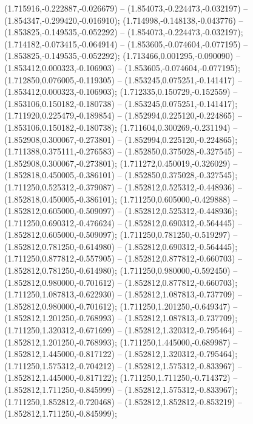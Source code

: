  (1.715916,-0.222887,-0.026679) -- (1.854073,-0.224473,-0.032197) -- (1.854347,-0.299420,-0.016910);
 (1.714998,-0.148138,-0.043776) -- (1.853825,-0.149535,-0.052292) -- (1.854073,-0.224473,-0.032197);
 (1.714182,-0.073415,-0.064914) -- (1.853605,-0.074604,-0.077195) -- (1.853825,-0.149535,-0.052292);
 (1.713466,0.001295,-0.090090) -- (1.853412,0.000323,-0.106903) -- (1.853605,-0.074604,-0.077195);
 (1.712850,0.076005,-0.119305) -- (1.853245,0.075251,-0.141417) -- (1.853412,0.000323,-0.106903);
 (1.712335,0.150729,-0.152559) -- (1.853106,0.150182,-0.180738) -- (1.853245,0.075251,-0.141417);
 (1.711920,0.225479,-0.189854) -- (1.852994,0.225120,-0.224865) -- (1.853106,0.150182,-0.180738);
 (1.711604,0.300269,-0.231194) -- (1.852908,0.300067,-0.273801) -- (1.852994,0.225120,-0.224865);
 (1.711388,0.375111,-0.276583) -- (1.852850,0.375028,-0.327545) -- (1.852908,0.300067,-0.273801);
 (1.711272,0.450019,-0.326029) -- (1.852818,0.450005,-0.386101) -- (1.852850,0.375028,-0.327545);
 (1.711250,0.525312,-0.379087) -- (1.852812,0.525312,-0.448936) -- (1.852818,0.450005,-0.386101);
 (1.711250,0.605000,-0.429888) -- (1.852812,0.605000,-0.509097) -- (1.852812,0.525312,-0.448936);
 (1.711250,0.690312,-0.476624) -- (1.852812,0.690312,-0.564445) -- (1.852812,0.605000,-0.509097);
 (1.711250,0.781250,-0.519297) -- (1.852812,0.781250,-0.614980) -- (1.852812,0.690312,-0.564445);
 (1.711250,0.877812,-0.557905) -- (1.852812,0.877812,-0.660703) -- (1.852812,0.781250,-0.614980);
 (1.711250,0.980000,-0.592450) -- (1.852812,0.980000,-0.701612) -- (1.852812,0.877812,-0.660703);
 (1.711250,1.087813,-0.622930) -- (1.852812,1.087813,-0.737709) -- (1.852812,0.980000,-0.701612);
 (1.711250,1.201250,-0.649347) -- (1.852812,1.201250,-0.768993) -- (1.852812,1.087813,-0.737709);
 (1.711250,1.320312,-0.671699) -- (1.852812,1.320312,-0.795464) -- (1.852812,1.201250,-0.768993);
 (1.711250,1.445000,-0.689987) -- (1.852812,1.445000,-0.817122) -- (1.852812,1.320312,-0.795464);
 (1.711250,1.575312,-0.704212) -- (1.852812,1.575312,-0.833967) -- (1.852812,1.445000,-0.817122);
 (1.711250,1.711250,-0.714372) -- (1.852812,1.711250,-0.845999) -- (1.852812,1.575312,-0.833967);
 (1.711250,1.852812,-0.720468) -- (1.852812,1.852812,-0.853219) -- (1.852812,1.711250,-0.845999);
